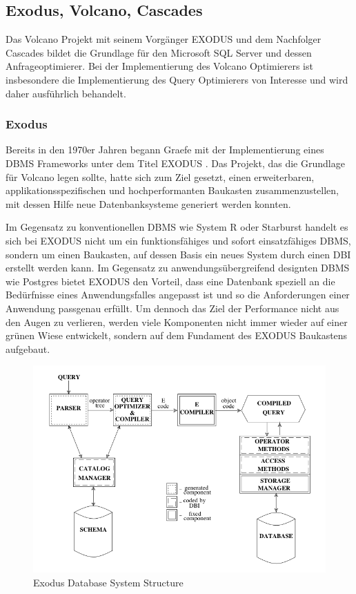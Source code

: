 \subsection{Exodus, Volcano, Cascades}

Das Volcano Projekt mit seinem Vorgänger \ac{EXODUS} und dem Nachfolger Cascades bildet die Grundlage für den Microsoft SQL Server und dessen Anfrageoptimierer. Bei der Implementierung des Volcano Optimierers ist insbesondere die Implementierung des Query Optimierers von Interesse und wird daher ausführlich behandelt.

\subsubsection{Exodus}


Bereits in den 1970er Jahren begann Graefe mit der Implementierung eines DBMS Frameworks unter dem Titel EXODUS \cite{carey1990exodus} . Das Projekt, das die Grundlage für Volcano legen sollte, hatte sich zum Ziel gesetzt, einen erweiterbaren, applikationsspezifischen und hochperformanten Baukasten zusammenzustellen, mit dessen Hilfe neue Datenbanksysteme generiert werden konnten. 

Im Gegensatz zu konventionellen DBMS wie System R oder Starburst handelt es sich bei EXODUS nicht um ein funktionsfähiges und sofort einsatzfähiges DBMS, sondern um einen Baukasten, auf dessen Basis ein neues System durch einen \ac{DBI} erstellt werden kann. Im Gegensatz zu anwendungsübergreifend designten DBMS wie Postgres bietet EXODUS den Vorteil, dass eine Datenbank speziell an die Bedürfnisse eines Anwendungsfalles angepasst ist und so die Anforderungen einer Anwendung passgenau erfüllt. Um dennoch das Ziel der Performance nicht aus den Augen zu verlieren, werden viele Komponenten nicht immer wieder auf einer grünen Wiese entwickelt, sondern auf dem Fundament des EXODUS Baukastens aufgebaut.

\begin{figure}[ht]
  \centering
  \includegraphics[width=\textwidth]{02_Related_Work/ExodusDatabaseSystemStructure.png}
  \caption{Exodus Database System Structure}
  \label{ExodusDatabaseStructure}
\end{figure}

